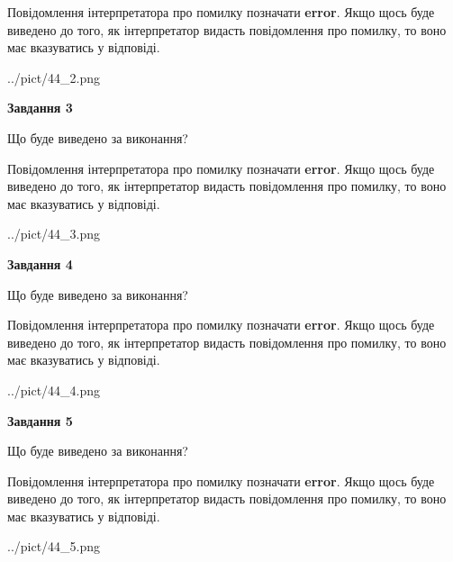 \documentclass[12pt, ukrainian]{article}
\begin{document}
{\begin {large}
Повідомлення інтерпретатора про помилку позначати \textbf{error}.
Якщо щось буде виведено до того, як інтерпретатор видасть повідомлення про помилку, 
то воно має вказуватись у відповіді. \par


\begin{center}
	{../pict/44_2.png}
\end{center}
\newpage

{\begin {center}\textbf{Завдання 3}\end {center}}\par
Що буде виведено за виконання?

Повідомлення інтерпретатора про помилку позначати \textbf{error}.
Якщо щось буде виведено до того, як інтерпретатор видасть повідомлення про помилку, 
то воно має вказуватись у відповіді. \par


\begin{center}
	{../pict/44_3.png}
\end{center}
\newpage

{\begin {center}\textbf{Завдання 4}\end {center}}\par
Що буде виведено за виконання?

Повідомлення інтерпретатора про помилку позначати \textbf{error}.
Якщо щось буде виведено до того, як інтерпретатор видасть повідомлення про помилку, 
то воно має вказуватись у відповіді. \par


\begin{center}
	{../pict/44_4.png}
\end{center}
\newpage

{\begin {center}\textbf{Завдання 5}\end {center}}\par
Що буде виведено за виконання?

Повідомлення інтерпретатора про помилку позначати \textbf{error}.
Якщо щось буде виведено до того, як інтерпретатор видасть повідомлення про помилку, 
то воно має вказуватись у відповіді. \par


\begin{center}
	{../pict/44_5.png}
\end{center}
\newpage


\end{large}}
\end{document}
